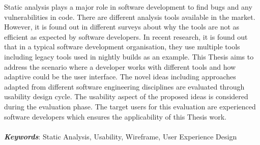 Static analysis plays a major role in software development to find bugs and any vulnerabilities in code. There are different analysis tools available in the market. However, it is found out in different surveys about why the tools are not as efficient as expected by software developers. In recent research, it is found out that in a typical software development organisation, they use multiple tools including legacy tools used in nightly builds as an example. This Thesis aims to address the scenario where a developer works with different tools and how adaptive could be the user interface. The novel ideas including approaches adapted from different software engineering disciplines are evaluated through usability design cycle. The usability aspect of the proposed ideas is considered during the evaluation phase. The target users for this evaluation are experienced software developers which ensures the applicability of this Thesis work. \\ \\
\textbf{\textit{Keywords}}: Static Analysis, Usability, Wireframe, User Experience Design
